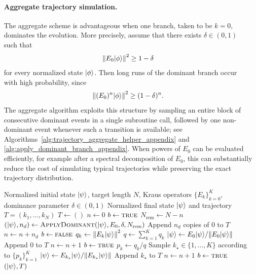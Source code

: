 \documentclass[showpacs,amsmath,amssymb,twocolumn,prx,superscriptaddress,10pt,aps,nofootinbib]{revtex4-2}
\DeclarePairedDelimiter\ket{|}{\rangle}
\begin{document}
\paragraph{Aggregate trajectory simulation.} The aggregate scheme is advantageous when one branch, taken to be $k=0$, dominates the evolution. More precisely, assume that there exists $\delta\in(0,1)$ such that
\begin{equation}
    \norm{E_0\ket{\phi}}^2 \ge 1-\delta
\end{equation}
for every normalized state $\ket{\phi}$. Then long runs of the dominant branch occur with high probability, since
\begin{equation}
    \norm{(E_0)^n \ket{\phi}}^2 \ge (1-\delta)^n.
\end{equation}
The aggregate algorithm exploits this structure by sampling an entire block of consecutive dominant events in a single subroutine call, followed by one non-dominant event whenever such a transition is available; see Algorithms~\ref{alg:trajectory_aggregate_helper_appendix} and \ref{alg:apply_dominant_branch_appendix}. When powers of $E_0$ can be evaluated efficiently, for example after a spectral decomposition of $E_0$, this can substantially reduce the cost of simulating typical trajectories while preserving the exact trajectory distribution.

\begin{algorithm}[H]
\caption{Aggregate trajectory simulation}
\label{alg:trajectory_aggregate_helper_appendix}
\small
\begin{algorithmic}[1]
\Require Normalized initial state $\ket{\psi}$, target length $N$, Kraus operators $\{E_k\}_{k=0}^{K}$, dominance parameter $\delta\in(0,1)$
\Ensure Normalized final state $\ket{\psi}$ and trajectory $T=(k_1,\ldots,k_N)$
\State $T \gets ()$
\State $n \gets 0$
\State $b \gets \textsc{true}$
        \State $N_{\mathrm{rem}} \gets N-n$
        \State $(\ket{\psi}, n_d) \gets \Call{ApplyDominant}{\ket{\psi}, E_0, \delta, N_{\mathrm{rem}}}$
        \State Append $n_d$ copies of $0$ to $T$
        \State $n \gets n + n_d$
        \State $b \gets \textsc{false}$
    \Else
            \State $q_k \gets \norm{E_k\ket{\psi}}^2$
        \EndFor
        \State $q \gets \sum_{k=1}^{K} q_k$
            \State $\ket{\psi} \gets E_0\ket{\psi} / \norm{E_0\ket{\psi}}$
            \State Append $0$ to $T$
            \State $n \gets n + 1$
            \State $b \gets \textsc{true}$
        \Else
                \State $p_k \gets q_k / q$
            \EndFor
            \State Sample $k_\star \in \{1,\ldots,K\}$ according to $\{p_k\}_{k=1}^{K}$
            \State $\ket{\psi} \gets E_{k_\star}\ket{\psi} / \norm{E_{k_\star}\ket{\psi}}$
            \State Append $k_\star$ to $T$
            \State $n \gets n + 1$
            \State $b \gets \textsc{true}$
        \EndIf
    \EndIf
\EndWhile
\State \Return $(\ket{\psi}, T)$
\end{algorithmic}
\end{algorithm}
\end{document}

